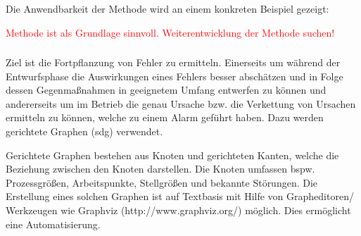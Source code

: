 Die Anwendbarkeit der Methode wird an einem konkreten Beispiel gezeigt: \cite{Parmar_1987a}

\textcolor{red}{Methode ist als Grundlage sinnvoll. Weiterentwicklung der Methode suchen!}

\subsubsection{\cite{Yang_2010}} Ziel ist die Fortpflanzung von Fehler zu ermitteln. Einerseits um w\"ahrend der Entwurfsphase die Auswirkungen eines Fehlers besser absch\"atzen und in Folge dessen Gegenma\ss{}nahmen in geeignetem Umfang entwerfen zu k\"onnen und andererseits um im Betrieb die genau Ursache bzw. die Verkettung von Ursachen ermitteln zu k\"onnen, welche zu einem Alarm gef\"uhrt haben. Dazu werden gerichtete Graphen (\ac{sdg}) verwendet.

Gerichtete Graphen bestehen aus Knoten und gerichteten Kanten, welche die Beziehung zwischen den Knoten darstellen. Die Knoten umfassen bspw. Prozessgr\"o\ss{}en, Arbeitspunkte, Stellgr\"o\ss{}en und bekannte St\"orungen.  
Die Erstellung eines solchen Graphen ist auf Textbasis mit Hilfe von Grapheditoren/ Werkzeugen wie Graphviz (http://www.graphviz.org/) m\"oglich. Dies erm\"oglicht eine Automatisierung.

